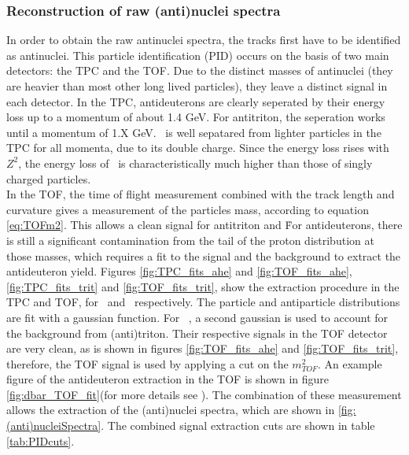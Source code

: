 \subsubsection{Reconstruction of raw (anti)nuclei spectra}
In order to obtain the raw antinuclei spectra, the tracks first have to be identified as antinuclei. This particle identification (PID) occurs on the basis of two main detectors: the TPC and the TOF. Due to the distinct masses of antinuclei (they are heavier than most other long lived particles), they leave a distinct signal in each detector. In the TPC, antideuterons are clearly seperated by their energy loss up to a momentum of about 1.4 GeV. For antitriton, the seperation works until a momentum of 1.X GeV. \ahe\ is well sepatared from lighter particles in the TPC for all momenta, due to its double charge. Since the energy loss rises with $Z^2$, the energy loss of \ahe\ is characteristically much higher than those of singly charged particles. \\
In the TOF, the time of flight measurement combined with the track length and curvature gives a measurement of the particles mass, according to equation \ref{eq:TOFm2}. This allows a clean signal for antitriton and \ahe\. For antideuterons, there is still a significant contamination from the tail of the proton distribution at those masses, which requires a fit to the signal and the background to extract the antideuteron yield. Figures \ref{fig:TPC_fits_ahe} and \ref{fig:TOF_fits_ahe}, \ref{fig:TPC_fits_trit} and \ref{fig:TOF_fits_trit}, show the extraction procedure in the TPC and TOF, for \ahe\ and \atrit\, respectively. The particle and antiparticle distributions are fit with a gaussian function. For \ahe\ , a second gaussian is used to account for the background from (anti)triton. Their respective signals in the TOF detector are very clean, as is shown in figures \ref{fig:TOF_fits_ahe} and \ref{fig:TOF_fits_trit}, therefore, the TOF signal is used by applying a cut on the $m_{TOF}^2$. An example figure of the antideuteron extraction in the TOF is shown in figure \ref{fig:dbar_TOF_fit}(for more details see \cite{dbar_ann}). The combination of these measurement allows the extraction of the (anti)nuclei spectra, which are shown in \ref{fig:(anti)nucleiSpectra}. The combined signal extraction cuts are shown in table \ref{tab:PIDcuts}.

\begin{equation}\label{eq:TOFm2}
    
\end{equation}

